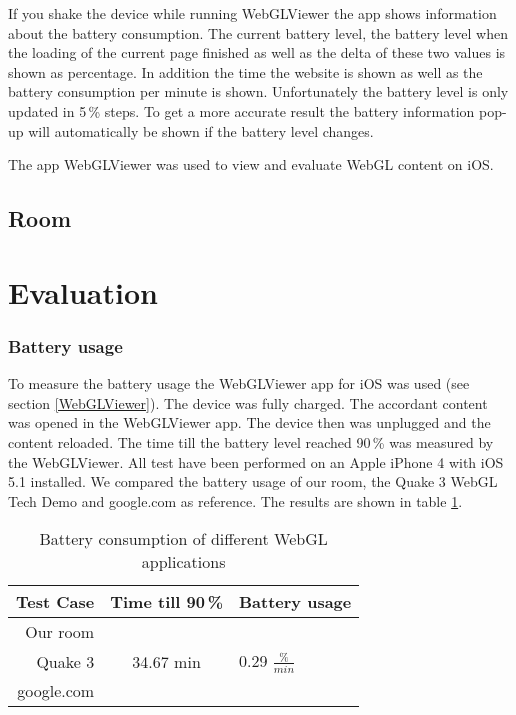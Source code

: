 \documentclass[12pt,journal,compsoc]{IEEEtran}
\begin{document}
	If you shake the device while running WebGLViewer the app shows information about the battery consumption. The current battery level, the battery level when the loading of the current page finished as well as the delta of these two values is shown as percentage. In addition the time the website is shown as well as the battery consumption per minute is shown. Unfortunately the battery level is only updated in 5\,\% steps. To get a more accurate result the battery information pop-up will automatically be shown if the battery level changes.
	
	The app WebGLViewer was used to view and evaluate WebGL content on iOS. 

\subsection{Room}

\section{Evaluation}

\subsubsection{Battery usage}
To measure the battery usage the WebGLViewer app for iOS was used (see section \ref{WebGLViewer}). The device was fully charged. The accordant content was opened in the WebGLViewer app. The device then was unplugged and the content reloaded. The time till the battery level reached 90\,\% was measured by the WebGLViewer. All test have been performed on an Apple iPhone 4 with iOS 5.1 installed. We compared the battery usage of our room, the Quake 3 WebGL Tech Demo and google.com as reference. The results are shown in table \ref{batteryTable}. 

\begin{table}[htb]
\begin{tabular}{r|c|l}
	\textbf{Test Case}		& \textbf{Time till 90\,\%}				& \textbf{Battery usage}		\\
	\hline
	Our room				&										&								\\
	Quake 3					&	34.67 min							& 0.29 $\frac{\%}{min}$			\\
	google.com				&										&								\\
\end{tabular}
\caption{Battery consumption of different WebGL applications\label{batteryTable}}
\end{table}
\end{document}
